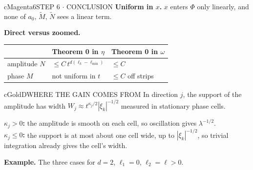\documentclass[10pt]{article}
\newcommand{\lab}[2]{\textbf{\color{#1}#2}}
\begin{document}
\begin{minipage}[t][49.0cm][t]{0.322\textwidth}
\begin{panel}{cMagenta}{6}{STEP 6 $\cdot$ CONCLUSION}
\lab{cMagenta}{Uniform in $x$.} $x$ enters $\Phi$ only linearly, and none of $a_0$, $\tilde M$,
$\tilde N$ sees a linear term.

\lab{cMagenta}{Direct versus zoomed.}

{\small
\begin{tabular}{@{}p{3cm}p{4.2cm}p{3.5cm}@{}}
 & \textbf{Theorem 0 in $\eta$} & \textbf{Theorem 0 in $\omega$}\\\hline
amplitude $N$ & $\le C\,t^{d(\ell_k-\ell_{\min})}$ & $\le C$\\
phase $M$ & not uniform in $t$ & $\le C$ off strips\\
\end{tabular}}
\end{panel}
\vfill
\begin{panel}{cGold}{D}{WHERE THE GAIN COMES FROM}
In direction $j$, the support of the amplitude has width $W_j\approx t^{\kappa_j/2}|\xi_k|^{-1/2}$
measured in stationary phase cells.

\begin{center}
\end{center}

\lab{cGold}{$\kappa_j>0$:} the amplitude is smooth on each cell, so oscillation gives
$\lambda^{-1/2}$.\\
\lab{cGold}{$\kappa_j\le0$:} the support is at most about one cell wide, up to
$|\xi_k|^{-1/2}$, so trivial integration already gives the cell's width.

\lab{cGold}{Example.} The three cases for $d=2$, $\ell_1=0$, $\ell_2=\ell>0$.


\end{panel}
\end{minipage}
\end{document}
